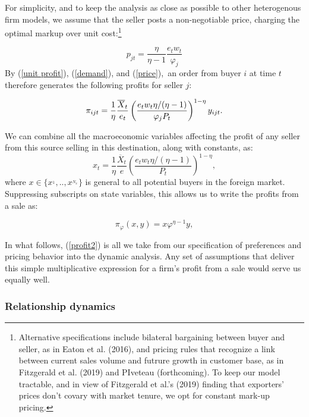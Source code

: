 \documentclass[12pt]{article}
\begin{document}
For simplicity, and to keep the analysis as close as possible to other
heterogenous firm models, we assume that the seller posts a non-negotiable
price, charging the optimal markup over unit cost:\footnote{%
Alternative specifications include bilateral bargaining between
buyer and seller, as in Eaton et al. (2016), and pricing rules that recognize a link between current sales volume and futrure growth in customer base, as in  Fitzgerald et al.
(2019) and PIveteau (forthcoming). To keep our model tractable, and in view of Fitzgerald et al.'s (2019) finding that exporters' prices don't covary with market tenure, we opt for constant mark-up pricing.\medskip}

\begin{equation}
p_{jt}=\frac{\eta }{\eta -1}\frac{e_{t}w_{t}}{\varphi _{j}}  \label{price}
\end{equation}%
By (\ref{unit profit}), (\ref{demand}), and (\ref{price}),\ an order from
buyer $i$ at time $t$ therefore generates the following profits for seller $%
j $:

\begin{equation*}
\pi _{ijt}=\frac{1}{\eta }\frac{\overline{X}_{t}}{e_{t}}\left( \frac{%
e_{t}w_{t}\eta /(\eta -1)}{\varphi _{j}P_{t}}\right) ^{1-\eta }y_{ijt}.
\end{equation*}

We can combine all the macroeconomic variables affecting the profit of any
seller from this source selling in this destination, along with constants,
as:%
\begin{equation*}
x_{t}=\frac{1}{\eta }\frac{\overline{X}_{t}}{e}\left( \frac{e_{t}w_{t}\eta
/(\eta -1)}{P_{t}}\right) ^{1-\eta },
\end{equation*}%
where $x\in \{x^{_{1}},..,x^{_{N_{x}}}\}$ is general to all potential buyers
in the foreign market. Suppressing subscripts on state variables, this
allows us to write the profits from a sale as:

\begin{equation}
\pi _{\varphi }(x,y)=x\varphi ^{\eta -1}y,  \label{profit2}
\end{equation}
\qquad \qquad

In what follows, (\ref{profit2}) is all we take from our specification of
preferences and pricing behavior into the dynamic analysis. Any set of
assumptions that deliver this simple multiplicative expression for a firm's
profit from a sale would serve us equally well.

\subsubsection{Relationship dynamics}
\end{document}
